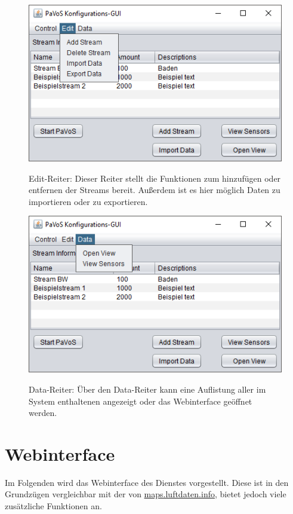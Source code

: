 \begin{figure}[H]
	\centering
		\includegraphics[width=0.6\linewidth]{gui/backend/BackendGUIMenu2.png}\\
	\caption{Edit-Reiter: Dieser Reiter stellt die Funktionen zum hinzufügen oder entfernen der Streams bereit. Außerdem ist es hier möglich Daten zu importieren oder zu exportieren.}
\end{figure}

\begin{figure}[H]
	\centering
		\includegraphics[width=0.6\linewidth]{gui/backend/BackendGUIMenu3.png}\\
	\caption{Data-Reiter: Über den Data-Reiter kann eine Auflistung aller im System enthaltenen  angezeigt  oder das Webinterface geöffnet werden.}
\end{figure}
\newpage
\section{Webinterface}
Im Folgenden wird das Webinterface des Dienstes vorgestellt. Diese ist in den Grundzügen vergleichbar mit der von \url{maps.luftdaten.info}, bietet jedoch viele zusätzliche Funktionen an.

